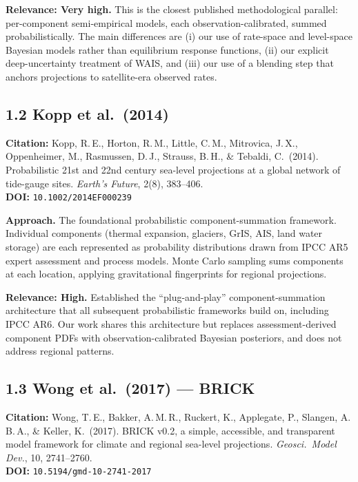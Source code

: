 \documentclass[11pt]{article}
\begin{document}
\noindent\textbf{Relevance: Very high.} This is the closest published
methodological parallel: per-component semi-empirical models, each
observation-calibrated, summed probabilistically. The main differences are
(i) our use of rate-space and level-space Bayesian models rather than
equilibrium response functions, (ii) our explicit deep-uncertainty
treatment of WAIS, and (iii) our use of a blending step that anchors
projections to satellite-era observed rates.

\subsection*{1.2 Kopp et al.\ (2014)}

\noindent\textbf{Citation:} Kopp, R.\,E., Horton, R.\,M., Little, C.\,M.,
Mitrovica, J.\,X., Oppenheimer, M., Rasmussen, D.\,J., Strauss, B.\,H.,
\& Tebaldi, C.\ (2014). Probabilistic 21st and 22nd century sea-level
projections at a global network of tide-gauge sites.
\textit{Earth's Future}, 2(8), 383--406.\\
\textbf{DOI:} \texttt{10.1002/2014EF000239}

\noindent\textbf{Approach.} The foundational probabilistic
component-summation framework. Individual components (thermal expansion,
glaciers, GrIS, AIS, land water storage) are each represented as
probability distributions drawn from IPCC AR5 expert assessment and process
models. Monte Carlo sampling sums components at each location, applying
gravitational fingerprints for regional projections.

\noindent\textbf{Relevance: High.} Established the ``plug-and-play''
component-summation architecture that all subsequent probabilistic
frameworks build on, including IPCC AR6. Our work shares this architecture
but replaces assessment-derived component PDFs with observation-calibrated
Bayesian posteriors, and does not address regional patterns.

\subsection*{1.3 Wong et al.\ (2017) --- BRICK}

\noindent\textbf{Citation:} Wong, T.\,E., Bakker, A.\,M.\,R.,
Ruckert, K., Applegate, P., Slangen, A.\,B.\,A., \& Keller, K.\ (2017).
BRICK v0.2, a simple, accessible, and transparent model framework for
climate and regional sea-level projections.
\textit{Geosci.\ Model Dev.}, 10, 2741--2760.\\
\textbf{DOI:} \texttt{10.5194/gmd-10-2741-2017}
\end{document}
